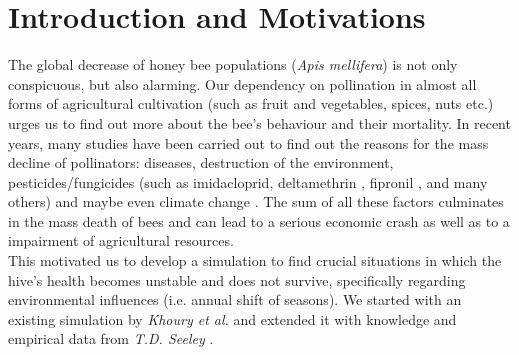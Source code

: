 \section{Introduction and Motivations}
The global decrease of honey bee populations (\textit{Apis mellifera}) is not only conspicuous, but also alarming. Our dependency on pollination in almost all forms of agricultural cultivation (such as fruit and vegetables, spices, nuts etc.) urges us to find out more about the bee's behaviour and their mortality. In recent years, many studies \cite{potts10} \cite{thomann13} have been carried out to find out the reasons for the mass decline of pollinators: diseases, destruction of the environment, pesticides/fungicides (such as imidacloprid, deltamethrin \cite{decourtye04}, fipronil \cite{bernadou09}, and many others) and maybe even climate change \cite{schweiger10}. The sum of all these factors culminates in the mass death of bees and can lead to a serious economic crash as well as to a impairment of agricultural resources.\\
This motivated us to develop a simulation to find crucial situations in which the hive's health becomes unstable and does not survive, specifically regarding environmental influences (i.e. annual shift of seasons). We started with an existing simulation by \textit{Khoury et al.} \cite{khoury13} and extended it with knowledge and empirical data from \textit{T.D. Seeley} \cite{seeley95}.